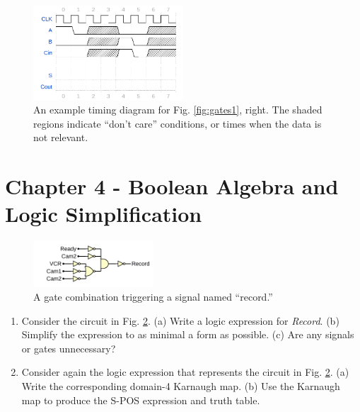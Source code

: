 \documentclass[10pt]{article}
\begin{document}
\begin{figure}[hb]
\centering
\includegraphics[width=0.5\textwidth]{timingExample2.pdf}
\caption{\label{fig:timing2} An example timing diagram for Fig. \ref{fig:gates1}, right.  The shaded regions indicate ``don't care'' conditions, or times when the data is not relevant.}
\end{figure}

\section{Chapter 4 - Boolean Algebra and Logic Simplification}
\begin{figure}[ht]
\centering
\includegraphics[width=0.4\textwidth]{gateExample4.pdf}
\caption{\label{fig:gates2} A gate combination triggering a signal named ``record.''}
\end{figure}
\begin{enumerate}
\item Consider the circuit in Fig. \ref{fig:gates2}.  (a) Write a logic expression for \textit{Record}. (b) Simplify the expression to as minimal a form as possible. (c) Are any signals or gates unnecessary? \\ \vspace{3cm}
\item Consider again the logic expression that represents the circuit in Fig. \ref{fig:gates2}. (a) Write the corresponding domain-4 Karnaugh map.  (b) Use the Karnaugh map to produce the S-POS expression and truth table. \\ \vspace{3cm}
\end{enumerate}
\end{document}

